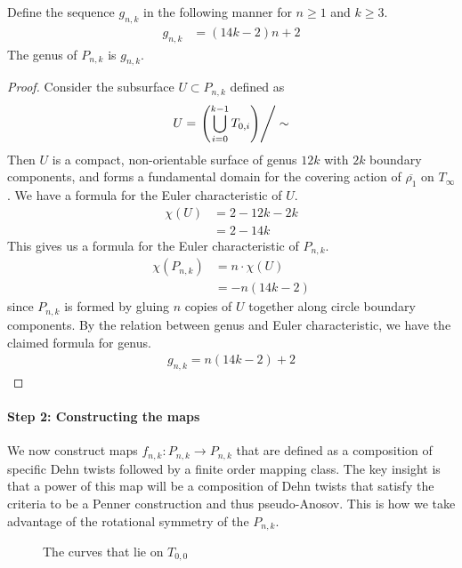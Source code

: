 \begin{lem}
\label{lem:genera}
Define the sequence $g_{n,k}$ in the following manner for $n \geq 1$ and $k \geq 3$.
\begin{align*}
    g_{n,k} &= (14k - 2)n + 2
\end{align*}
    The genus of $P_{n,k}$ is $g_{n,k}$.
\end{lem}
\begin{proof}
  Consider the subsurface $U \subset P_{n,k}$ defined as
  \begin{align*}
    U = \left. \left( \bigcup_{i =0}^{k-1} T_{0,i} \right)\right/\sim
  \end{align*}
  Then $U$ is a compact, non-orientable surface of
  genus $12k$ with $2k$ boundary components, and forms a fundamental domain for the covering action of
  $\overline{\rho_1}$ on $T_\infty$. We have a formula for the Euler characteristic of $U$.
  \begin{align*}
    \chi(U) &= 2 - 12k - 2k \\
            &= 2 - 14k
  \end{align*}
  This gives us a formula for the Euler characteristic of $P_{n,k}$.
  \begin{align*}
    \chi(P_{n,k}) &= n \cdot \chi(U)\\
                  &= -n(14k - 2)
  \end{align*}
  since $P_{n,k}$ is formed by gluing $n$ copies of $U$ together along circle boundary components. By the
  relation between genus and Euler characteristic, we have the claimed formula for genus.
  \begin{align*}
    g_{n,k} = n(14k-2) + 2
  \end{align*}
\end{proof}

\paragraph{Step 2: Constructing the maps}

We now construct maps $f_{n,k}: P_{n,k} \to P_{n,k}$ that are defined as a composition of specific Dehn twists
followed by a finite order mapping class. The key insight is that a power of this map will be a composition of
Dehn twists that satisfy the criteria to be a Penner construction and thus pseudo-Anosov. This is how we take
advantage of the rotational symmetry of the $P_{n,k}$.

\begin{figure}[h]
    \centering
    \caption{The curves that lie on $T_{0,0}$}
    \label{fig:curves}
\end{figure}

